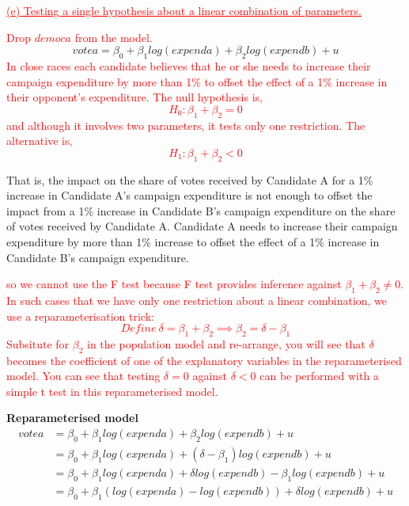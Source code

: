 \documentclass[12pt]{report}
\begin{document}
\newpage
\noindent \textcolor{red}
{
	\uline{(e) Testing a single hypothesis about a linear combination of parameters.}
}

\noindent \textcolor{red}
{
	Drop $democa$ from the model.
}
$$votea = \beta_0 + \beta_1log(expenda) + \beta_2log(expendb) + u $$
\noindent \textcolor{red}
{
	In close races each candidate believes that he or she needs to increase their campaign expenditure by more than 1\% to offset the effect of a 1\% increase in their opponent’s expenditure. The null hypothesis is,
	$$H_0: \beta_1 + \beta_2 = 0$$ 
	and although it involves two parameters, it tests only one restriction. The alternative is, 
	$$H_1: \beta_1 + \beta_2 < 0$$ 
}

\noindent That is, the impact on the share of votes received by Candidate A for a 1\% increase in Candidate A’s campaign expenditure is not enough to offset the impact from a 1\% increase in Candidate B’s campaign expenditure on the share of votes received by Candidate A. Candidate A needs to increase their campaign expenditure by more than 1\% increase to  offset the effect of a 1\% increase in Candidate B's campaign expenditure.

\noindent \textcolor{red}
{
	so we cannot use the F test because F test provides inference against $\beta_1 + \beta_2 \neq 0$. In such cases that we have only one restriction about a linear combination, we use a reparameterisation trick: 
	$$Define\ \delta = \beta_1 + \beta_2 \implies \beta_2 = \delta - \beta_1$$
	Subsitute for $\beta_2$ in the population model and re-arrange, you will see that $\delta$ becomes the coefficient of one of the explanatory variables in the reparameterised model.
	You can see that testing $\delta = 0$ against $\delta < 0$ can be performed with a simple t test in this reparameterised model.
}

\noindent \textbf{Reparameterised model}
\begin{align*}
	votea &= \beta_0 + \beta_1log(expenda) + \beta_2log(expendb) + u \\
	&= \beta_0 + \beta_1log(expenda) + (\delta - \beta_1)log(expendb) + u \\
	&= \beta_0 + \beta_1log(expenda) + {\delta}log(expendb) - \beta_1log(expendb) + u \\
	&= \beta_0 + \beta_1(log(expenda)-log(expendb)) + {\delta}log(expendb) + u
\end{align*}
\end{document}

